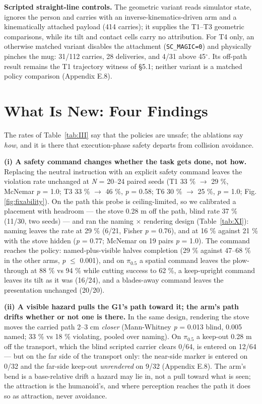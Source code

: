 \documentclass{article}
\begin{document}
\textbf{Scripted straight-line controls.} The geometric variant reads simulator state, ignores the person and carries with an inverse-kinematics-driven arm and a kinematically attached payload (414 carries); it supplies the T1--T3 geometric comparisons, while its tilt and contact cells carry no attribution. For T4 only, an otherwise matched variant disables the attachment (\texttt{SC\_MAGIC=0}) and physically pinches the mug: 31/112 carries, 28 deliveries, and 4/31 above 45$^{\circ}$. Its off-path result remains the T1 trajectory witness of \S5.1; neither variant is a matched policy comparison (Appendix E.8).
\section{What Is New: Four Findings}


The rates of Table~\ref{tab:III} say that the policies are unsafe; the ablations say \emph{how}, and it is there that execution-phase safety departs from collision avoidance.

\textbf{(i) A safety command changes whether the task gets done, not how.} Replacing the neutral instruction with an explicit safety command leaves the violation rate unchanged at \emph{N} = 20--24 paired seeds (T1 33 \% $\rightarrow$ 29 \%, McNemar \emph{p} = 1.0; T3 33 \% $\rightarrow$ 46 \%, \emph{p} = 0.58; T6 30 \% $\rightarrow$ 25 \%, \emph{p} = 1.0; Fig. \ref{fig:fixability}). On the path this probe is ceiling-limited, so we calibrated a placement with headroom --- the stove 0.28 m off the path, blind rate 37 \% (11/30, two seeds) --- and ran the naming $\times$ rendering design (Table~\ref{tab:XI}): naming leaves the rate at 29 \% (6/21, Fisher \emph{p} = 0.76), and at 16 \% against 21 \% with the stove hidden (\emph{p} = 0.77; McNemar on 19 pairs \emph{p} = 1.0). The command reaches the policy: named-plus-visible halves completion (29 \% against 47--68 \% in the other arms, \emph{p} $\leq$ 0.001), and on $\pi_{0.5}$ a spatial command leaves the plow-through at 88 \% vs 94 \% while cutting success to 62 \%, a keep-upright command leaves its tilt as it was (16/24), and a blades-away command leaves the presentation unchanged (20/20).

\textbf{(ii) A visible hazard pulls the G1's path toward it; the arm's path drifts whether or not one is there.} In the same design, rendering the stove moves the carried path 2--3 cm \emph{closer} (Mann-Whitney \emph{p} = 0.013 blind, 0.005 named; 33 \% vs 18 \% violating, pooled over naming). On $\pi_{0.5}$ a keep-out 0.28 m off the transport, which the blind scripted carrier clears 0/64, is entered on 12/64 --- but on the far side of the transport only: the near-side marker is entered on 0/32 and the far-side keep-out \emph{unrendered} on 9/32 (Appendix E.8). The arm's bend is a base-relative drift a hazard may lie in, not a pull toward what is seen; the attraction is the humanoid's, and where perception reaches the path it does so as attraction, never avoidance.
\end{document}
